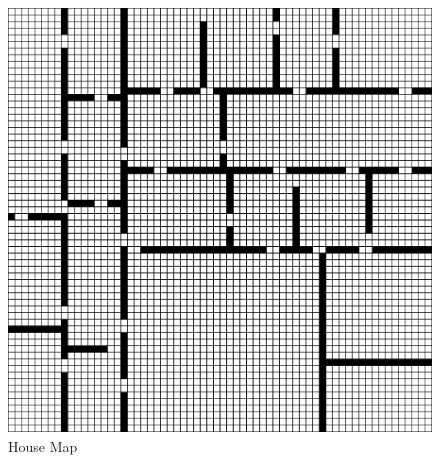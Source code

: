 \clearpage

\begin{figure}[h!]
    \centering
    \includegraphics[scale=0.82]{images/m3.png}
    \caption{House Map}
    \label{fig: rep_House Map}
\end{figure}

